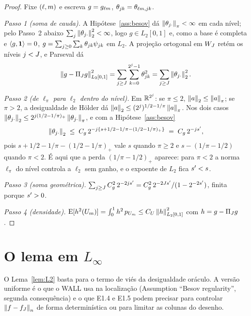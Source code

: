\documentclass[11pt,a4paper]{article}
\begin{document}
\begin{proof}
Fixe $(\ell,m)$ e escreva $g = g_{\ell m}$, $\theta_{jk} =
\theta_{\ell m,jk}$.

\emph{Passo 1 (soma de cauda).} A Hipótese~\ref{ass:besov} dá
$\left\lVert \theta_{j\cdot} \right\rVert_{\pi} < \infty$ em cada nível; pelo Passo~2 abaixo
$\sum_{j}\left\lVert \theta_{j\cdot} \right\rVert_{2}^{2} < \infty$, logo $g \in
L_{2}[0,1]$ e, como a base é completa e $\langle g, \mathbf{1} \rangle = 0$,
$g = \sum_{j\ge 0}\sum_{k}\theta_{jk}\psi_{jk}$ em $L_{2}$.
A projeção ortogonal em $W_{J}$ retém os níveis $j < J$, e Parseval dá
\[
  \left\lVert g - \Pi_{J} g \right\rVert_{L_{2}[0,1]}^{2}
  = \sum_{j\ge J}\sum_{k=0}^{2^{j}-1}\theta_{jk}^{2}
  = \sum_{j \ge J}\left\lVert \theta_{j\cdot} \right\rVert_{2}^{2}.
\]

\emph{Passo 2 (de $\ell_{\pi}$ para $\ell_{2}$ dentro do nível).} Em
$\mathbb{R}^{2^{j}}$: se $\pi \le 2$, $\left\lVert a \right\rVert_{2} \le \left\lVert a \right\rVert_{\pi}$; se
$\pi > 2$, a desigualdade de Hölder dá $\left\lVert a \right\rVert_{2} \le
(2^{j})^{1/2 - 1/\pi}\left\lVert a \right\rVert_{\pi}$. Nos dois casos
$\left\lVert \theta_{j\cdot} \right\rVert_{2} \le 2^{j(1/2 - 1/\pi)_{+}}
\left\lVert \theta_{j\cdot} \right\rVert_{\pi}$, e com a Hipótese~\ref{ass:besov}
\[
  \left\lVert \theta_{j\cdot} \right\rVert_{2}
  \;\le\; C_{g}\,2^{-j\{s + 1/2 - 1/\pi - (1/2 - 1/\pi)_{+}\}}
  \;=\; C_{g}\,2^{-js'},
\]
pois $s + 1/2 - 1/\pi - (1/2 - 1/\pi)_{+}$ vale $s$ quando $\pi \ge 2$ e
$s - (1/\pi - 1/2)$ quando $\pi < 2$. É aqui que a perda $(1/\pi - 1/2)_{+}$
aparece: para $\pi < 2$ a norma $\ell_{\pi}$ do nível controla a $\ell_{2}$
sem ganho, e o expoente de $L_{2}$ fica $s' < s$.

\emph{Passo 3 (soma geométrica).}
$\sum_{j\ge J}C_{g}^{2}\,2^{-2js'} = C_{g}^{2}\,2^{-2Js'}/(1 - 2^{-2s'})$,
finita porque $s' > 0$.

\emph{Passo 4 (densidade).} $\mathrm{E}[h^{2}(U_{m})] = \int_{0}^{1}h^{2}\,p_{U_{m}}
\le C_{U}\left\lVert h \right\rVert_{L_{2}[0,1]}^{2}$ com $h = g - \Pi_{J} g$.
\end{proof}

\section{O lema em $L_{\infty}$}

O Lema~\ref{lem:L2} basta para o termo de viés da desigualdade oráculo. A
versão uniforme é o que o WALL usa na localização (Assumption ``Besov
regularity'', segunda consequência) e o que E1.4 e E1.5 podem precisar para
controlar $\left\lVert f - f_{J} \right\rVert_{n}$ de forma determinística ou para limitar as
colunas do desenho.
\end{document}
